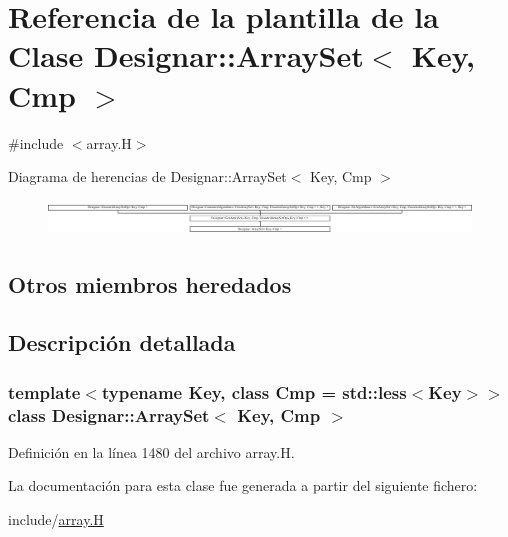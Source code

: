 \hypertarget{class_designar_1_1_array_set}{}\section{Referencia de la plantilla de la Clase Designar\+:\+:Array\+Set$<$ Key, Cmp $>$}
\label{class_designar_1_1_array_set}


{\ttfamily \#include $<$array.\+H$>$}

Diagrama de herencias de Designar\+:\+:Array\+Set$<$ Key, Cmp $>$\begin{figure}[H]
\begin{center}
\leavevmode
\includegraphics[height=0.922570cm]{class_designar_1_1_array_set}
\end{center}
\end{figure}
\subsection*{Otros miembros heredados}


\subsection{Descripción detallada}
\subsubsection*{template$<$typename Key, class Cmp = std\+::less$<$\+Key$>$$>$\newline
class Designar\+::\+Array\+Set$<$ Key, Cmp $>$}



Definición en la línea 1480 del archivo array.\+H.



La documentación para esta clase fue generada a partir del siguiente fichero\+:\begin{DoxyCompactItemize}
\item 
include/\hyperlink{array_8_h}{array.\+H}\end{DoxyCompactItemize}
